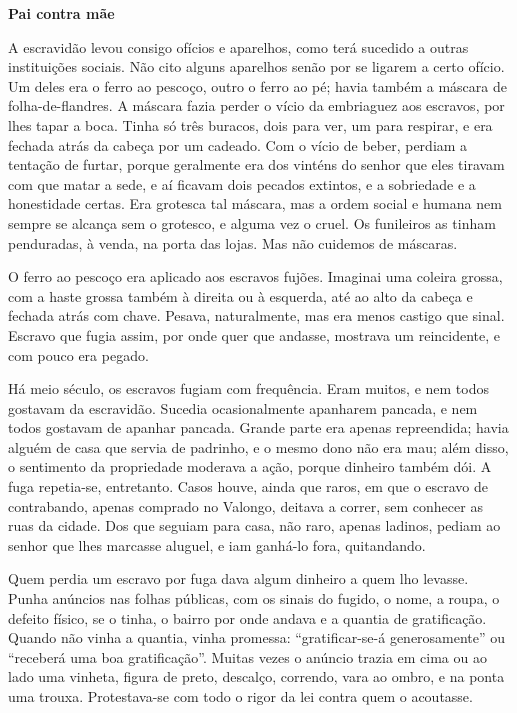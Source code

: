 




\textbf{Pai contra mãe}

A escravidão levou consigo ofícios e aparelhos, como terá sucedido a
outras instituições sociais. Não cito alguns aparelhos senão por se
ligarem a certo ofício. Um deles era o ferro ao pescoço, outro o ferro
ao pé; havia também a máscara de folha-de-flandres. A máscara fazia
perder o vício da embriaguez aos escravos, por lhes tapar a boca. Tinha
só três buracos, dois para ver, um para respirar, e era fechada atrás da
cabeça por um cadeado. Com o vício de beber, perdiam a tentação de
furtar, porque geralmente era dos vinténs do senhor que eles tiravam com
que matar a sede, e aí ficavam dois pecados extintos, e a sobriedade e a
honestidade certas. Era grotesca tal máscara, mas a ordem social e
humana nem sempre se alcança sem o grotesco, e alguma vez o cruel. Os
funileiros as tinham penduradas, à venda, na porta das lojas. Mas não
cuidemos de máscaras.

O ferro ao pescoço era aplicado aos escravos fujões. Imaginai uma
coleira grossa, com a haste grossa também à direita ou à esquerda, até
ao alto da cabeça e fechada atrás com chave. Pesava, naturalmente, mas
era menos castigo que sinal. Escravo que fugia assim, por onde quer que
andasse, mostrava um reincidente, e com pouco era pegado.

Há meio século, os escravos fugiam com frequência. Eram muitos, e nem
todos gostavam da escravidão. Sucedia ocasionalmente apanharem pancada,
e nem todos gostavam de apanhar pancada. Grande parte era apenas
repreendida; havia alguém de casa que servia de padrinho, e o mesmo dono
não era mau; além disso, o sentimento da propriedade moderava a ação,
porque dinheiro também dói. A fuga repetia-se, entretanto. Casos houve,
ainda que raros, em que o escravo de contrabando, apenas comprado no
Valongo, deitava a correr, sem conhecer as ruas da cidade. Dos que
seguiam para casa, não raro, apenas ladinos, pediam ao senhor que lhes
marcasse aluguel, e iam ganhá-lo fora, quitandando.

Quem perdia um escravo por fuga dava algum dinheiro a quem lho levasse.
Punha anúncios nas folhas públicas, com os sinais do fugido, o nome, a
roupa, o defeito físico, se o tinha, o bairro por onde andava e a
quantia de gratificação. Quando não vinha a quantia, vinha promessa:
``gratificar-se-á generosamente'' ou ``receberá uma boa gratificação''.
Muitas vezes o anúncio trazia em cima ou ao lado uma vinheta, figura de
preto, descalço, correndo, vara ao ombro, e na ponta uma trouxa.
Protestava-se com todo o rigor da lei contra quem o acoutasse.

